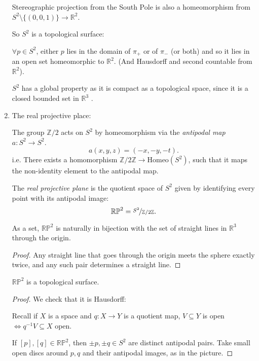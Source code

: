 \begin{eg}
\begin{enumerate}
\begin{note}
            Stereographic projection from the South Pole is also a homeomorphism from \(S^2 \setminus \{(0,0,1)\} \to \mathbb{R}^2\). 
        \end{note}
        So \(S^2\) is a topological surface:

        \(\forall p \in S^2\), either \(p\) lies in the domain of \(\pi_+\) or of \(\pi_-\) (or both) and so it lies in an open set homeomorphic to \(\mathbb{R}^2\). (And Hausdorff and second countable from \(\mathbb{R}^2\)).
        \begin{remark}
            \(S^2\) has a global property as it is compact as a topological space, since it is a closed bounded set in \(\mathbb{R}^3\) .
        \end{remark}
        \item The real projective place:
        
        The group \(\mathbb{Z} / 2\) acts on \(S^2\) by homeomorphism via the \textit{antipodal map} \(a: S^2 \to S^2\).
        \[
            a(x,y,z) = (-x,-y,-t).
        \]
        i.e. There exists a homomorphism \(\mathbb{Z} / 2\mathbb{Z} \to  \mathrm{Homeo} (S^2)\), such that it maps the non-identity element to the antipodal map.

        \begin{definition}
            The \textit{real projective plane} is the quotient space of \(S^2\) given by identifying every point with its antipodal image:
            \[
                \mathbb{RP}^2 = \nicefrac{S^2}{\mathbb{Z}/ 2\mathbb{Z}}.
            \]
        \end{definition}

        \begin{lemma}
            As a set, \(\mathbb{RP}^2\) is naturally in bijection with the set of straight lines in \(\mathbb{R}^3\) through the origin.
        \end{lemma}
        \begin{proof}
             Any straight line that goes through the origin meets the sphere exactly twice, and any such pair determines a straight line.
        \end{proof}
        \begin{lemma}
            \(\mathbb{RP}^2\) is a topological surface.
        \end{lemma}
        \begin{proof}
            We check that it is Hausdorff:

            Recall if \(X\) is a space and \(q: X \to Y\) is a quotient map, \(V \subseteq Y\) is open \(\iff q^{-1}V \subseteq X\) open. 

            If \([p],[q] \in \mathbb{RP}^2\), then \(\pm p, \pm q \in S^2\) are distinct antipodal pairs. Take small open discs around \(p,q\) and their antipodal images, as in the picture.
        \end{proof}
    \end{enumerate}
\end{eg}